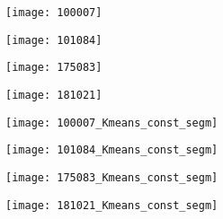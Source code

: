 \begin{figure}[!ht]
         
    \begin{subfigure}[t]{\textwidth+20pt\relax}
    	\centering
    	\texttt{[image: 100007]} 
    \end{subfigure}      
    \begin{subfigure}[b]{0.23\textwidth}
    	\centering
        \texttt{[image: 101084]}
    \end{subfigure}
    \begin{subfigure}[b]{0.23\textwidth}
    	\centering
        \texttt{[image: 175083]}
    \end{subfigure}
    \begin{subfigure}[b]{0.23\textwidth}
    	\centering
        \texttt{[image: 181021]}
    \end{subfigure} \vspace{5pt}   
    
    
    \begin{subfigure}[t]{\textwidth+20pt\relax}
    	\centering
    	\texttt{[image: 100007\_Kmeans\_const\_segm]} 
    \end{subfigure}      
    \begin{subfigure}[b]{0.23\textwidth}
    	\centering
        \texttt{[image: 101084\_Kmeans\_const\_segm]}
    \end{subfigure}
    \begin{subfigure}[b]{0.23\textwidth}
    	\centering
        \texttt{[image: 175083\_Kmeans\_const\_segm]}
    \end{subfigure}
    \begin{subfigure}[b]{0.23\textwidth}
    	\centering
        \texttt{[image: 181021\_Kmeans\_const\_segm]}
    \end{subfigure} \vspace{5pt}
    

\end{figure}
